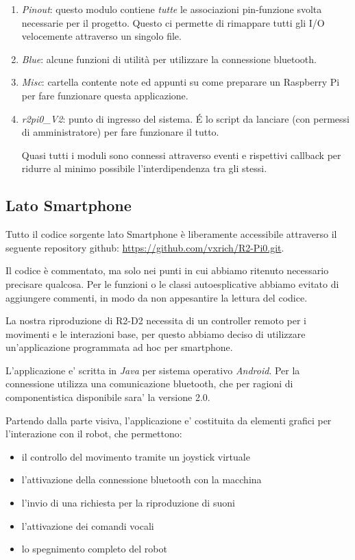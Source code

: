 \documentclass[12pt]{article}
\begin{document}
\begin{enumerate}
\item \emph{Pinout}: questo modulo contiene \emph{tutte} le associazioni pin-funzione svolta necessarie per il progetto. Questo ci permette di rimappare tutti gli I/O velocemente attraverso un singolo file.
\item \emph{Blue}: alcune funzioni di utilità per utilizzare la connessione bluetooth.
\item \emph{Misc}: cartella contente note ed appunti su come preparare un Raspberry Pi per fare funzionare questa applicazione.
\item \emph{r2pi0\_{}V2}: punto di ingresso del sistema. \'E lo script da lanciare (con permessi di amministratore) per fare funzionare il tutto.

Quasi tutti i moduli sono connessi attraverso eventi e rispettivi callback per ridurre al minimo possibile l'interdipendenza tra gli stessi.
\end{enumerate}

\subsection{Lato Smartphone}

Tutto il codice sorgente lato Smartphone è liberamente accessibile attraverso il seguente repository github: \url{https://github.com/vxrich/R2-Pi0.git}.

Il codice è commentato, ma solo nei punti in cui abbiamo ritenuto necessario precisare qualcosa. Per le funzioni o le classi autoesplicative abbiamo evitato di aggiungere commenti, in modo da non appesantire la lettura del codice.

La nostra riproduzione di R2-D2 necessita di un controller remoto per i movimenti e le interazioni base,
per questo abbiamo deciso di utilizzare un'applicazione programmata ad hoc per smartphone.

L'applicazione e' scritta in \emph{Java} per sistema operativo \emph{Android}.
Per la connessione utilizza una comunicazione bluetooth, che per ragioni di componentistica disponibile sara' la versione 2.0.

\medskip

Partendo dalla parte visiva, l'applicazione e' costituita da elementi grafici per l'interazione con il robot, che permettono:
\begin{itemize}
\item il controllo del movimento tramite un joystick virtuale
\item l'attivazione della connessione bluetooth con la macchina
\item l'invio di una richiesta per la riproduzione di suoni
\item l'attivazione dei comandi vocali
\item lo spegnimento completo del robot
\end{itemize}
\end{document}
